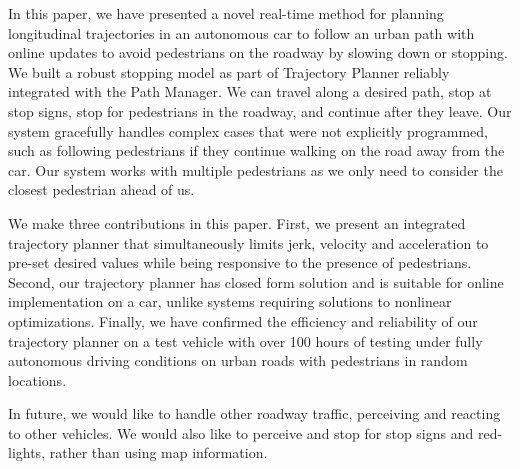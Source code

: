 \documentclass[letterpaper, 10 pt, conference]{ieeeconf}  %
\begin{document}
In this paper, we have presented a novel real-time method for planning longitudinal trajectories in an autonomous car to follow an urban path with online updates to avoid pedestrians on the roadway by slowing down or stopping.
We built a robust stopping model as part of Trajectory Planner reliably integrated with the Path Manager.
We can travel along a desired path, stop at stop signs, stop for pedestrians in the roadway, and continue after they leave.
Our system gracefully handles complex cases that were not explicitly programmed, such as following pedestrians if they continue walking on the road away from the car. 
Our system works with multiple pedestrians as we only need to consider the closest pedestrian ahead of us. 

We make three contributions in this paper. First, we present an integrated trajectory planner that
simultaneously limits jerk, velocity and acceleration to pre-set desired values while being responsive 
to the presence of pedestrians.
Second, our trajectory planner has closed form solution and is suitable for online implementation
on a car, unlike systems requiring solutions to nonlinear optimizations. Finally, we have confirmed the
efficiency and reliability of our trajectory planner on a test vehicle with over 100 hours of testing
under fully autonomous driving conditions on urban roads with pedestrians in random locations. 

In future, we would like to handle other roadway traffic, perceiving and reacting to other vehicles. We would also like to perceive and stop for stop signs and red-lights,
rather than using map information.





\end{document}
